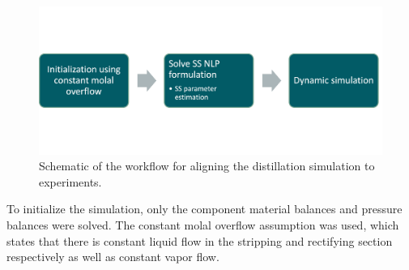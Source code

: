 \begin{figure}
    \centering
    \includegraphics[width=\textwidth]{gfx/Chapter06/simulation_workflow.png}
    \caption{Schematic of the workflow for aligning the distillation simulation to experiments.}
    \label{fig:simulation_workflow}
\end{figure}

To initialize  the simulation, only the component material balances and pressure balances were solved. The constant molal overflow assumption was used, which states that there is constant liquid flow in the stripping and rectifying section respectively as well as constant vapor flow. 

